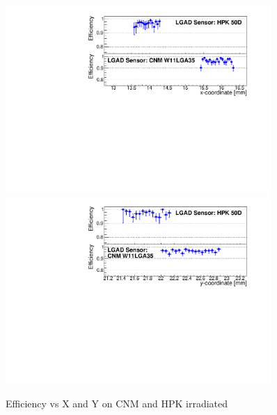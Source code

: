 \documentclass[preprint,1p]{elsarticle}
\begin{document}
\begin{figure}[htbp] 
\centering
\includegraphics[width=0.90\textwidth]{figs/USCSBoard_HPK50DIrradiated-CNMW11LGA35_Run936-961/IrradiatedSensorStudy_Efficiency_vs_X.pdf} 
\includegraphics[width=0.90\textwidth]{figs/USCSBoard_HPK50DIrradiated-CNMW11LGA35_Run936-961/IrradiatedSensorStudy_Efficiency_vs_Y.pdf} 
\caption{Efficiency vs X and Y on CNM and HPK irradiated} 
\label{fig:Sensors} 
\end{figure} 
\end{document}
